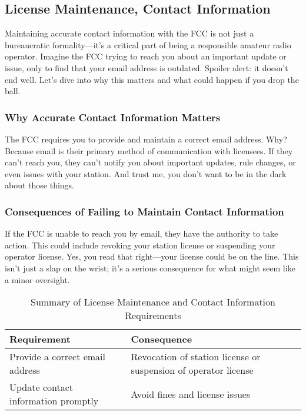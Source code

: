 \subsection{License Maintenance, Contact Information}
\label{subsec:maint-contact}

Maintaining accurate contact information with the FCC is not just a bureaucratic formality—it’s a critical part of being a responsible amateur radio operator. Imagine the FCC trying to reach you about an important update or issue, only to find that your email address is outdated. Spoiler alert: it doesn’t end well. Let’s dive into why this matters and what could happen if you drop the ball.

\subsubsection*{Why Accurate Contact Information Matters}
The FCC requires you to provide and maintain a correct email address. Why? Because email is their primary method of communication with licensees. If they can’t reach you, they can’t notify you about important updates, rule changes, or even issues with your station. And trust me, you don’t want to be in the dark about those things.

\subsubsection*{Consequences of Failing to Maintain Contact Information}
If the FCC is unable to reach you by email, they have the authority to take action. This could include revoking your station license or suspending your operator license. Yes, you read that right—your license could be on the line. This isn’t just a slap on the wrist; it’s a serious consequence for what might seem like a minor oversight.


\begin{table}[h!]
    \centering
    \begin{tabular}{|l|l|}
        \hline
        \textbf{Requirement} & \textbf{Consequence} \\
        \hline
        Provide a correct email address & Revocation of station license or suspension of operator license \\
        \hline
        Update contact information promptly & Avoid fines and license issues \\
        \hline
    \end{tabular}
    \caption{Summary of License Maintenance and Contact Information Requirements}
    \label{tab:license-maintenance-summary}
\end{table}

